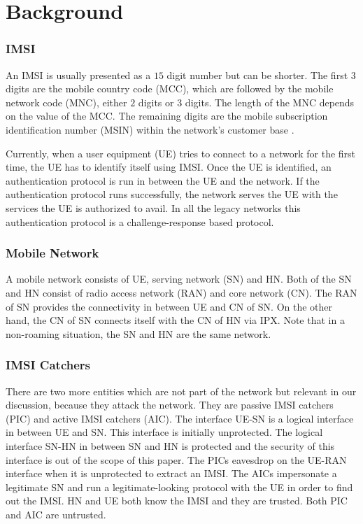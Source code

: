 \documentclass[conference]{IEEEtran}
\begin{document}
\section{Background} \label{background}
\subsubsection{IMSI}
An IMSI is usually presented as a $15$ digit number but can be shorter. The first $3$ digits are the mobile country code (MCC), which are followed by the mobile network code (MNC), either $2$ digits or $3$ digits. The length of the MNC depends on the value of the MCC. The remaining digits are the mobile subscription identification number (MSIN) within the network's customer base \cite{TS23003}. 

Currently, when a user equipment (UE) tries to connect to a network for the first time, the UE has to identify itself using IMSI. Once the UE is identified, an authentication protocol is run in between the UE and the network. If the authentication protocol runs successfully, the network serves the UE with the services the UE is authorized to avail. In all the legacy networks this authentication protocol is a challenge-response based protocol. 


\subsubsection{Mobile Network}
A mobile network consists of UE, serving network (SN) and HN. Both of the SN and HN consist of radio access network (RAN) and core network (CN). The RAN of SN provides the connectivity in between UE and CN of SN. On the other hand, the CN of SN connects itself with the CN of HN via IPX. Note that in a non-roaming situation, the SN and HN are the same network. 

\subsubsection{IMSI Catchers}
There are two more entities which are not part of the network but relevant in our discussion, because they attack the network. They are passive IMSI catchers (PIC) and active IMSI catchers (AIC). The interface UE-SN is a logical interface in between UE and SN. This interface is initially unprotected. The logical interface SN-HN in between SN and HN is protected and the security of this interface is out of the scope of this paper. The PICs eavesdrop on the UE-RAN interface when it is unprotected to extract an IMSI. The AICs impersonate a legitimate SN and run a legitimate-looking protocol with the UE in order to find out the IMSI. HN and UE both know the IMSI and they are trusted. Both PIC and AIC are untrusted. 
\end{document}
